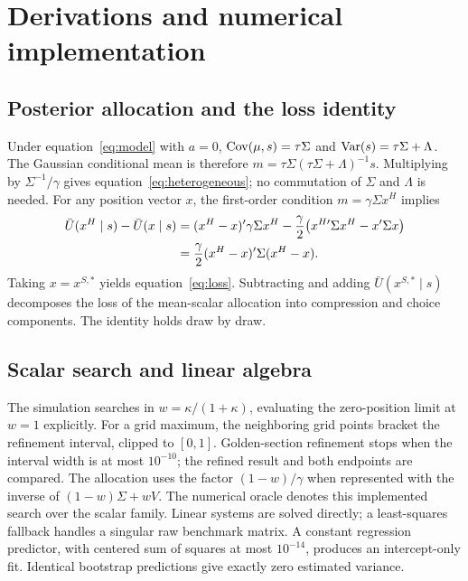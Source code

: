 \section{Derivations and numerical implementation}
\label{app:math}
\setcounter{table}{0}\setcounter{figure}{0}
\subsection{Posterior allocation and the loss identity}
Under equation~\eqref{eq:model} with $a=0$, $\operatorname{Cov}(\mu,s)=\tau\Sigma$ and $\operatorname{Var}(s)=\tau\Sigma+\Lambda$. The Gaussian conditional mean is therefore $m=\tau\Sigma(\tau\Sigma+\Lambda)^{-1}s$. Multiplying by $\Sigma^{-1}/\gamma$ gives equation~\eqref{eq:heterogeneous}; no commutation of $\Sigma$ and $\Lambda$ is needed. For any position vector $x$, the first-order condition $m=\gamma\Sigma x^H$ implies
\begin{align}
\bar U(x^H\mid s)-\bar U(x\mid s)
&=(x^H-x)'\gamma\Sigma x^H
 -\frac{\gamma}{2}\bigl(x^{H\prime}\Sigma x^H-x'\Sigma x\bigr)\notag\\
&=\frac{\gamma}{2}(x^H-x)'\Sigma(x^H-x).
\end{align}
Taking $x=x^{S,*}$ yields equation~\eqref{eq:loss}. Subtracting and adding $\bar U(x^{S,*}\mid s)$ decomposes the loss of the mean-scalar allocation into compression and choice components. The identity holds draw by draw.



\subsection{Scalar search and linear algebra}
The simulation searches in $w=\kappa/(1+\kappa)$, evaluating the zero-position limit at $w=1$ explicitly. For a grid maximum, the neighboring grid points bracket the refinement interval, clipped to $[0,1]$. Golden-section refinement stops when the interval width is at most $10^{-10}$; the refined result and both endpoints are compared. The allocation uses the factor $(1-w)/\gamma$ when represented with the inverse of $(1-w)\Sigma+wV$. The numerical oracle denotes this implemented search over the scalar family. Linear systems are solved directly; a least-squares fallback handles a singular raw benchmark matrix. A constant regression predictor, with centered sum of squares at most $10^{-14}$, produces an intercept-only fit. Identical bootstrap predictions give exactly zero estimated variance.

